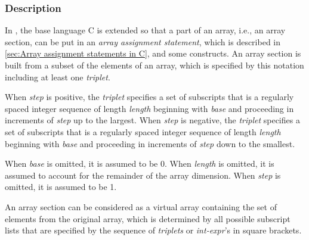 \subsubsection*{Description}

In {\XMPC}, the base language C is extended so that a part of an array,
i.e., an array section, can be put in an {\it array assignment
statement}, which is described in \ref{sec:Array assignment statements
in C}, and some {\XMP} constructs. An array section is built from a
subset of the elements of an array, which is specified by this notation
including at least one {\it triplet}.

When {\it step} is positive, the {\it triplet} specifies a set of
subscripts that is a regularly spaced integer sequence of length {\it
length} beginning with {\it base} and proceeding in increments of {\it
step} up to the largest.
%
When {\it step} is negative, the {\it triplet} specifies a set of
subscripts that is a regularly spaced integer sequence of length {\it
length} beginning with {\it base} and proceeding in increments of {\it
step} down to the smallest.


When {\it base} is omitted, it is assumed to be 0. When {\it length}
is omitted, it is assumed to account for the remainder of the array
dimension. When {\it step} is omitted, it is assumed to be 1.



An array section can be considered as a virtual array containing the set
of elements from the original array, which is determined by all possible
subscript lists that are specified by the sequence of {\it triplets} or
{\it int-expr}'s in square brackets.

